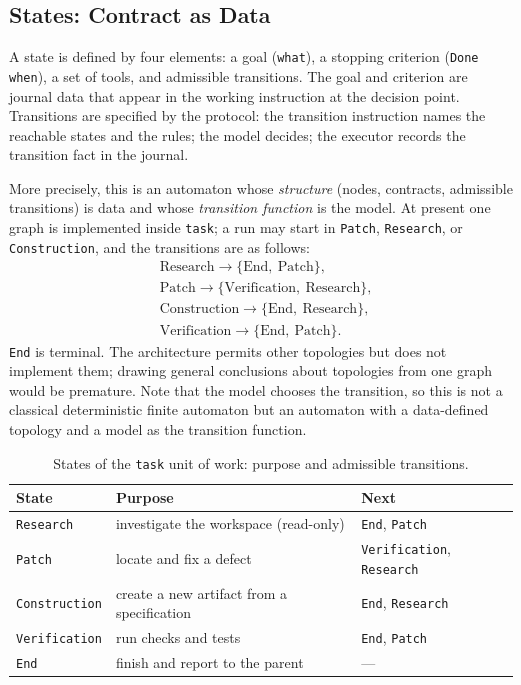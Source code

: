 \documentclass[11pt,a4paper]{article}
\begin{document}
\subsection{States: Contract as Data}
\label{sec:states}

A state is defined by four elements: a goal (\texttt{what}), a stopping criterion (\texttt{Done
when}), a set of tools, and admissible transitions. The goal and criterion are journal data that
appear in the working instruction at the decision point. Transitions are specified by the
protocol: the transition instruction names the reachable states and the rules; the model
decides; the executor records the transition fact in the journal.

More precisely, this is an automaton whose \emph{structure} (nodes, contracts, admissible
transitions) is data and whose \emph{transition function} is the model. At present one graph is
implemented inside \texttt{task}; a run may start in \texttt{Patch}, \texttt{Research}, or \texttt{Construction}, and the
transitions are as follows:
\[
\begin{aligned}
&\text{Research} \rightarrow \{\text{End},\ \text{Patch}\}, \\
&\text{Patch} \rightarrow \{\text{Verification},\ \text{Research}\}, \\
&\text{Construction} \rightarrow \{\text{End},\ \text{Research}\}, \\
&\text{Verification} \rightarrow \{\text{End},\ \text{Patch}\}.
\end{aligned}
\]
\texttt{End} is terminal. The architecture permits other topologies but does not implement them; drawing
general conclusions about topologies from one graph would be premature. Note that the model
chooses the transition, so this is not a classical deterministic finite automaton but an
automaton with a data-defined topology and a model as the transition function.

\begin{table}[h]
\centering
\small
\caption{States of the \texttt{task} unit of work: purpose and admissible transitions.}
\label{tab:states}
\begin{tabular}{@{}lll@{}}
\toprule
State & Purpose & Next \\
\midrule
\texttt{Research} & investigate the workspace (read-only) & \texttt{End}, \texttt{Patch} \\
\texttt{Patch} & locate and fix a defect & \texttt{Verification}, \texttt{Research} \\
\texttt{Construction} & create a new artifact from a specification & \texttt{End}, \texttt{Research} \\
\texttt{Verification} & run checks and tests & \texttt{End}, \texttt{Patch} \\
\texttt{End} & finish and report to the parent & --- \\
\bottomrule
\end{tabular}
\end{table}
\end{document}
